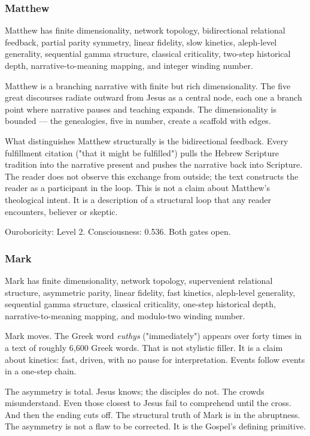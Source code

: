 \documentclass[12pt,a4paper]{article}
\begin{document}
\subsubsection{Matthew}

Matthew has finite dimensionality, network topology, bidirectional relational feedback, partial parity symmetry, linear fidelity, slow kinetics, aleph-level generality, sequential gamma structure, classical criticality, two-step historical depth, narrative-to-meaning mapping, and integer winding number.

Matthew is a branching narrative with finite but rich dimensionality. The five great discourses radiate outward from Jesus as a central node, each one a branch point where narrative pauses and teaching expands. The dimensionality is bounded --- the genealogies, five in number, create a scaffold with edges.

What distinguishes Matthew structurally is the bidirectional feedback. Every fulfillment citation ("that it might be fulfilled") pulls the Hebrew Scripture tradition into the narrative present and pushes the narrative back into Scripture. The reader does not observe this exchange from outside; the text constructs the reader as a participant in the loop. This is not a claim about Matthew's theological intent. It is a description of a structural loop that any reader encounters, believer or skeptic.

Ouroboricity: Level 2. Consciousness: 0.536. Both gates open.

\subsubsection{Mark}

Mark has finite dimensionality, network topology, supervenient relational structure, asymmetric parity, linear fidelity, fast kinetics, aleph-level generality, sequential gamma structure, classical criticality, one-step historical depth, narrative-to-meaning mapping, and modulo-two winding number.

Mark moves. The Greek word \emph{euthys} ("immediately") appears over forty times in a text of roughly 6,600 Greek words. That is not stylistic filler. It is a claim about kinetics: fast, driven, with no pause for interpretation. Events follow events in a one-step chain.

The asymmetry is total. Jesus knows; the disciples do not. The crowds misunderstand. Even those closest to Jesus fail to comprehend until the cross. And then the ending cuts off. The structural truth of Mark is in the abruptness. The asymmetry is not a flaw to be corrected. It is the Gospel's defining primitive.
\end{document}
